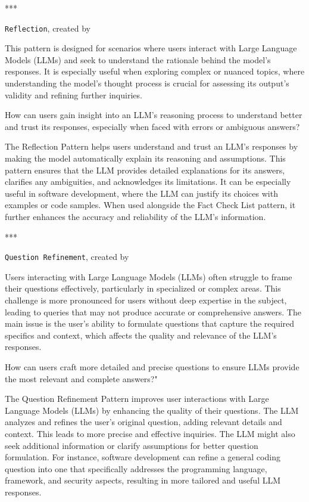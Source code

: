 \begin{center}
***
\end{center}


\texttt{Reflection}, created by \textcite{white2023prompt}

 This pattern is designed for scenarios where users interact with Large Language Models (LLMs) and seek to understand the rationale behind the model's responses. It is especially useful when exploring complex or nuanced topics, where understanding the model's thought process is crucial for assessing its output's validity and refining further inquiries.

 How can users gain insight into an LLM's reasoning process to understand better and trust its responses, especially when faced with errors or ambiguous answers?

 The Reflection Pattern helps users understand and trust an LLM's responses by making the model automatically explain its reasoning and assumptions. This pattern ensures that the LLM provides detailed explanations for its answers, clarifies any ambiguities, and acknowledges its limitations. It can be especially useful in software development, where the LLM can justify its choices with examples or code samples. When used alongside the Fact Check List pattern, it further enhances the accuracy and reliability of the LLM's information.

\begin{center}
***
\end{center}

\texttt{Question Refinement}, created by \textcite{white2023prompt}

 Users interacting with Large Language Models (LLMs) often struggle to frame their questions effectively, particularly in specialized or complex areas. This challenge is more pronounced for users without deep expertise in the subject, leading to queries that may not produce accurate or comprehensive answers. The main issue is the user's ability to formulate questions that capture the required specifics and context, which affects the quality and relevance of the LLM's responses.

 How can users craft more detailed and precise questions to ensure LLMs provide the most relevant and complete answers?"

 The Question Refinement Pattern improves user interactions with Large Language Models (LLMs) by enhancing the quality of their questions. The LLM analyzes and refines the user's original question, adding relevant details and context. This leads to more precise and effective inquiries. The LLM might also seek additional information or clarify assumptions for better question formulation. For instance, software development can refine a general coding question into one that specifically addresses the programming language, framework, and security aspects, resulting in more tailored and useful LLM responses.

